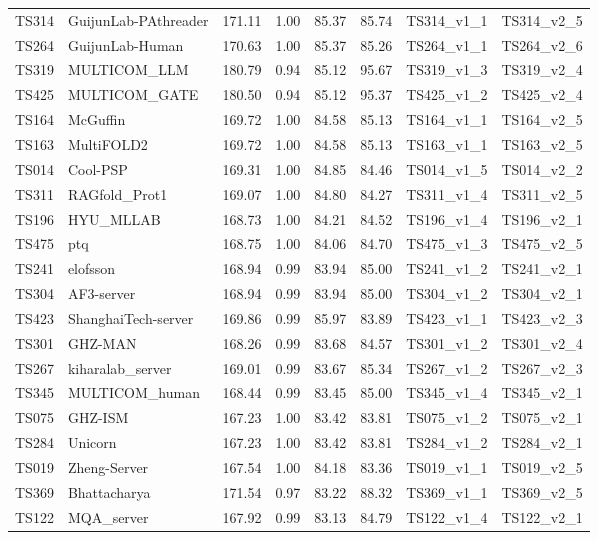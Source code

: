\begin{longtable}{llllllll}
TS314 & GuijunLab-PAthreader & 171.11 & 1.00 & 85.37 & 85.74 & TS314\_v1\_1 & TS314\_v2\_5 \\ 
TS264 & GuijunLab-Human & 170.63 & 1.00 & 85.37 & 85.26 & TS264\_v1\_1 & TS264\_v2\_6 \\ 
TS319 & MULTICOM\_LLM & 180.79 & 0.94 & 85.12 & 95.67 & TS319\_v1\_3 & TS319\_v2\_4 \\ 
TS425 & MULTICOM\_GATE & 180.50 & 0.94 & 85.12 & 95.37 & TS425\_v1\_2 & TS425\_v2\_4 \\ 
TS164 & McGuffin & 169.72 & 1.00 & 84.58 & 85.13 & TS164\_v1\_1 & TS164\_v2\_5 \\ 
TS163 & MultiFOLD2 & 169.72 & 1.00 & 84.58 & 85.13 & TS163\_v1\_1 & TS163\_v2\_5 \\ 
TS014 & Cool-PSP & 169.31 & 1.00 & 84.85 & 84.46 & TS014\_v1\_5 & TS014\_v2\_2 \\ 
TS311 & RAGfold\_Prot1 & 169.07 & 1.00 & 84.80 & 84.27 & TS311\_v1\_4 & TS311\_v2\_5 \\ 
TS196 & HYU\_MLLAB & 168.73 & 1.00 & 84.21 & 84.52 & TS196\_v1\_4 & TS196\_v2\_1 \\ 
TS475 & ptq & 168.75 & 1.00 & 84.06 & 84.70 & TS475\_v1\_3 & TS475\_v2\_5 \\ 
TS241 & elofsson & 168.94 & 0.99 & 83.94 & 85.00 & TS241\_v1\_2 & TS241\_v2\_1 \\ 
TS304 & AF3-server & 168.94 & 0.99 & 83.94 & 85.00 & TS304\_v1\_2 & TS304\_v2\_1 \\ 
TS423 & ShanghaiTech-server & 169.86 & 0.99 & 85.97 & 83.89 & TS423\_v1\_1 & TS423\_v2\_3 \\ 
TS301 & GHZ-MAN & 168.26 & 0.99 & 83.68 & 84.57 & TS301\_v1\_2 & TS301\_v2\_4 \\ 
TS267 & kiharalab\_server & 169.01 & 0.99 & 83.67 & 85.34 & TS267\_v1\_2 & TS267\_v2\_3 \\ 
TS345 & MULTICOM\_human & 168.44 & 0.99 & 83.45 & 85.00 & TS345\_v1\_4 & TS345\_v2\_1 \\ 
TS075 & GHZ-ISM & 167.23 & 1.00 & 83.42 & 83.81 & TS075\_v1\_2 & TS075\_v2\_1 \\ 
TS284 & Unicorn & 167.23 & 1.00 & 83.42 & 83.81 & TS284\_v1\_2 & TS284\_v2\_1 \\ 
TS019 & Zheng-Server & 167.54 & 1.00 & 84.18 & 83.36 & TS019\_v1\_1 & TS019\_v2\_5 \\ 
TS369 & Bhattacharya & 171.54 & 0.97 & 83.22 & 88.32 & TS369\_v1\_1 & TS369\_v2\_5 \\ 
TS122 & MQA\_server & 167.92 & 0.99 & 83.13 & 84.79 & TS122\_v1\_4 & TS122\_v2\_1 \\ 

\end{longtable}
